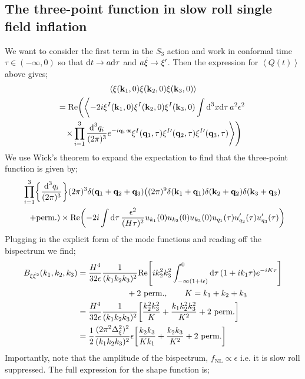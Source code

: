 \subsection{The three-point function in slow roll single field inflation}
We want to consider the first term in the $S_3$ action and work in conformal time $\tau \in (-\infty, 0)$ so that $\text{d} t \rightarrow a \text{d} \tau$ and $a\dot{\xi} \rightarrow \xi^{\prime}$. Then the expression for $\left< Q(t) \right>$ above gives;
\begin{multline*}
\left< \xi(\vec{k}_1, 0) \xi(\vec{k}_2, 0) \xi(\vec{k}_3, 0) \right> \\ = \text{Re}\left(\left< -2i \xi^I(\vec{k}_1, 0) \xi^I(\vec{k}_2, 0) \xi^I(\vec{k}_3, 0) \int{\ud^3 x \upd{\tau} a^2 \epsilon^2}\right. \right.\\
\left.\left.\times \prod_{i = 1}^{3}{\frac{\ud^3 q_i}{(2\pi)^3}e^{-i\vec{q}_i \cdot \vec{x}}\xi^I(\vec{q}_1, \tau)\xi^{I\prime}(\vec{q}_2, \tau) \xi^{I\prime}(\vec{q}_3, \tau)} \right>\right)
\end{multline*}
We use Wick's theorem to expand the expectation to find that the three-point function is given by;
\begin{multline*}
\prod_{i = 1}^{3}\left\{\frac{\ud^3 q_i}{(2\pi)^3}\right\}(2\pi)^3 \delta(\vec{q}_1 + \vec{q}_2 + \vec{q}_3) \left((2\pi)^9 \delta(\vec{k}_1 + \vec{q}_1)\delta(\vec{k}_2 + \vec{q}_2)\delta(\vec{k}_3 + \vec{q}_3)\right. \\ \left.\quad+ \text{perm.}\right) \times \text{Re}\left(-2i\int{\upd{\tau}\frac{\epsilon^2}{(H\tau)^2}u_{k_1}(0)u_{k_2}(0)u_{k_3}(0)u_{q_1}(\tau)u\pr_{q_2}(\tau)u_{q_3}\pr(\tau)}\right)
\end{multline*}
Plugging in the explicit form of the mode functions and reading off the bispectrum we find;
\begin{align*}
B_{\xi \dot{\xi}^2}(k_1, k_2, k_3) &= \frac{H^4}{32\epsilon}\frac{1}{(k_1 k_2 k_3)^2}\text{Re}\left[ik_2^2 k_3^2 \int_{-\infty(1 + i\epsilon)}^{0}{\upd{\tau}(1 + ik_1\tau)e^{-iK\tau}}\right]\\
&\qquad \qquad \qquad + \text{2 perm.}, \qquad K = k_1 + k_2 + k_3 \\
&= \frac{H^4}{32\epsilon}\frac{1}{(k_1 k_2 k_3)^2}\left[\frac{k_2^2 k_3^2}{K} + \frac{k_1 k_2^2 k_3^2}{K^2} + \text{2 perm.}\right] \\
&= \frac{1}{2}\frac{(2\pi^2 \Delta^2_\xi)^2}{(k_1 k_2 k_3)^2}\epsilon\left[\frac{k_2 k_3}{K k_1} + \frac{k_2 k_3}{K^2} + \text{2 perm.}\right]
\end{align*}
Importantly, note that the amplitude of the bispectrum, $f_{\text{NL}} \propto \epsilon$ i.e. it is slow roll suppressed. The full expression for the shape function is;
